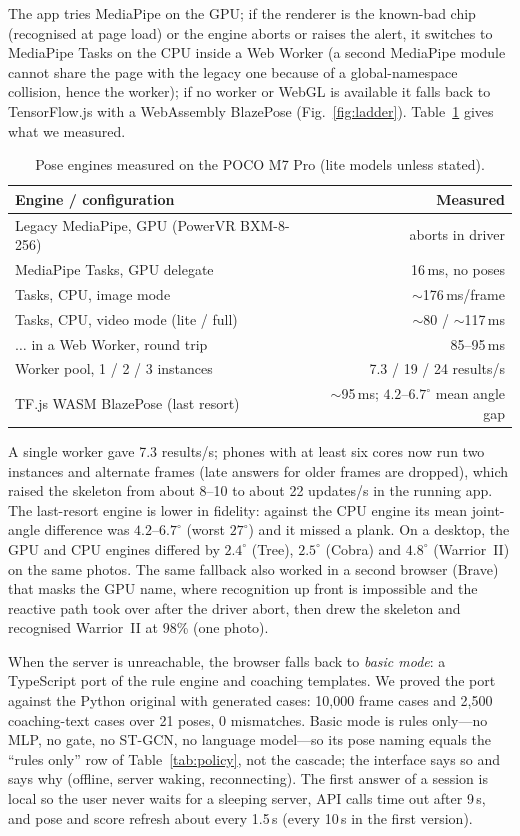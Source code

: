 The app tries MediaPipe on the GPU; if the renderer is the known-bad chip (recognised at page load) or the engine aborts or raises the alert, it switches to MediaPipe Tasks on the CPU inside a Web Worker (a second MediaPipe module cannot share the page with the legacy one because of a global-namespace collision, hence the worker); if no worker or WebGL is available it falls back to TensorFlow.js \cite{smilkov2019tfjs} with a WebAssembly BlazePose (Fig.~\ref{fig:ladder}). Table~\ref{tab:engines} gives what we measured.
\begin{table}[t]
\centering\footnotesize
\caption{Pose engines measured on the POCO M7 Pro (lite models unless stated).}\label{tab:engines}
\begin{tabularx}{\columnwidth}{@{}Xr@{}}
\toprule
Engine / configuration & Measured \\ \midrule
Legacy MediaPipe, GPU (PowerVR BXM-8-256) & aborts in driver \\
MediaPipe Tasks, GPU delegate & 16\,ms, no poses \\
Tasks, CPU, image mode & $\sim$176\,ms/frame \\
Tasks, CPU, video mode (lite / full) & $\sim$80 / $\sim$117\,ms \\
$\ldots$ in a Web Worker, round trip & 85--95\,ms \\
Worker pool, 1 / 2 / 3 instances & 7.3 / 19 / 24 results/s \\
TF.js WASM BlazePose (last resort) & $\sim$95\,ms; $4.2$--$6.7^\circ$ mean angle gap \\ \bottomrule
\end{tabularx}
\end{table}
A single worker gave 7.3 results/s; phones with at least six cores now run two instances and alternate frames (late answers for older frames are dropped), which raised the skeleton from about 8--10 to about 22 updates/s in the running app. The last-resort engine is lower in fidelity: against the CPU engine its mean joint-angle difference was $4.2$--$6.7^\circ$ (worst $27^\circ$) and it missed a plank. On a desktop, the GPU and CPU engines differed by $2.4^\circ$ (Tree), $2.5^\circ$ (Cobra) and $4.8^\circ$ (Warrior~II) on the same photos. The same fallback also worked in a second browser (Brave) that masks the GPU name, where recognition up front is impossible and the reactive path took over after the driver abort, then drew the skeleton and recognised Warrior~II at 98\% (one photo).

 When the server is unreachable, the browser falls back to \emph{basic mode}: a TypeScript port of the rule engine and coaching templates. We proved the port against the Python original with generated cases: 10{,}000 frame cases and 2{,}500 coaching-text cases over 21 poses, 0 mismatches. Basic mode is rules only---no MLP, no gate, no ST-GCN, no language model---so its pose naming equals the ``rules only'' row of Table~\ref{tab:policy}, not the cascade; the interface says so and says why (offline, server waking, reconnecting). The first answer of a session is local so the user never waits for a sleeping server, API calls time out after 9\,s, and pose and score refresh about every 1.5\,s (every 10\,s in the first version).

